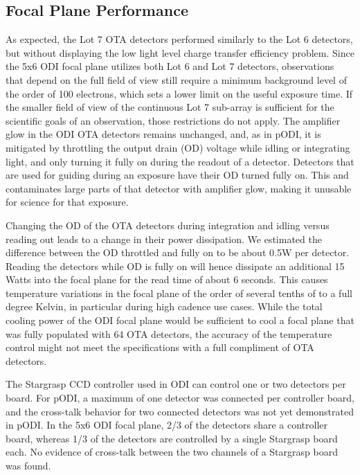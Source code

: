 \documentclass[]{spieman}
\begin{document}
\subsection{Focal Plane Performance}

As expected, the Lot 7 OTA detectors performed similarly to the Lot 6 detectors,
but without displaying the low light level charge transfer efficiency problem.
Since the 5x6 ODI focal plane utilizes both Lot 6 and Lot 7 detectors,
observations that depend on the full field of view still require a minimum
background level of the order of 100 electrons, which sets a lower limit on the
useful exposure time. If the smaller field of view of the continuous Lot 7
sub-array is sufficient for the scientific goals of an observation, those
restrictions do not apply. The amplifier glow in the ODI OTA detectors remains
unchanged, and, as in pODI, it is mitigated by throttling the output drain (OD)
voltage while idling or integrating light,  and only turning it fully on during
the readout of a detector. Detectors that are used for guiding during an
exposure have their OD turned fully on. This and contaminates large parts of
that detector with amplifier glow, making it unusable for science for that
exposure.

Changing the OD of the OTA detectors during integration and idling versus
reading out leads to a change in their power dissipation. We estimated the
difference between the OD throttled and fully on to be about 0.5W per detector.
Reading the detectors while OD is fully on will hence dissipate an additional 15
Watts into the focal plane for the read time of about 6 seconds. This causes
temperature variations in the focal plane of the order of several  tenths of to
a full degree Kelvin, in particular during high cadence use cases. While the
total cooling power of the ODI focal plane would be sufficient to cool a focal
plane that was fully populated with 64 OTA detectors, the accuracy of the
temperature control might not meet the specifications with a full compliment of
OTA detectors.


The Stargrasp CCD controller\cite{onaka2008} used in ODI can control one or two
detectors per board. For pODI, a maximum of one detector was connected per
controller board, and the cross-talk behavior for two connected detectors was
not yet demonstrated in pODI. In the 5x6 ODI focal plane, 2/3 of the detectors
share a controller board, whereas 1/3 of the detectors are controlled by a
single Stargrasp board each. No evidence of cross-talk between the two channels
of a Stargrasp board was found.
\end{document}
